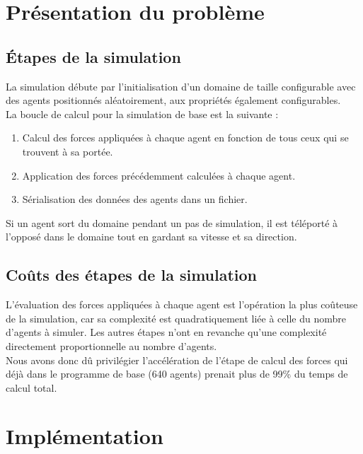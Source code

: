 




\pagestyle{fancy}

\maketitle

\tableofcontents
\clearpage

\section{Présentation du problème}

\subsection{Étapes de la simulation}
La simulation débute par l'initialisation d'un domaine de taille configurable avec des agents positionnés aléatoirement, aux propriétés également configurables.\\
La boucle de calcul pour la simulation de base est la suivante :
\begin{enumerate}
    \item Calcul des forces appliquées à chaque agent en fonction de tous ceux qui se trouvent à sa portée.
    \item Application des forces précédemment calculées à chaque agent.
    \item Sérialisation des données des agents dans un fichier.
\end{enumerate}
Si un agent sort du domaine pendant un pas de simulation, il est téléporté à l'opposé dans le domaine tout en gardant sa vitesse et sa direction.

\subsection{Coûts des étapes de la simulation}
L'évaluation des forces appliquées à chaque agent est l'opération la plus coûteuse de la simulation, car sa complexité est quadratiquement liée à celle du nombre d'agents à simuler. Les autres étapes n'ont en revanche qu'une complexité directement proportionnelle au nombre d'agents.\\
Nous avons donc dû privilégier l'accélération de l'étape de calcul des forces qui déjà dans le programme de base (640 agents) prenait plus de 99\% du temps de calcul total.



\newpage
\section{Implémentation}

